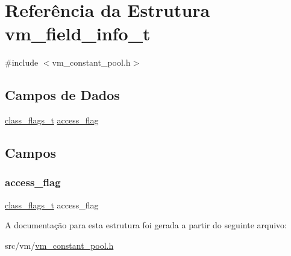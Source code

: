 \hypertarget{structvm__field__info__t}{}\section{Referência da Estrutura vm\+\_\+field\+\_\+info\+\_\+t}
\label{structvm__field__info__t}


{\ttfamily \#include $<$vm\+\_\+constant\+\_\+pool.\+h$>$}

\subsection*{Campos de Dados}
\begin{DoxyCompactItemize}
\item 
\hyperlink{vm__constant__pool_8h_a031d95f87ee8ea61a12297cc5e45b645}{class\+\_\+flags\+\_\+t} \hyperlink{structvm__field__info__t_a0ed46c37e2835f9d7d37ed57ce0cef23}{access\+\_\+flag}
\end{DoxyCompactItemize}


\subsection{Campos}
\mbox{\label{structvm__field__info__t_a0ed46c37e2835f9d7d37ed57ce0cef23}} 
\subsubsection{\texorpdfstring{access\+\_\+flag}{access\_flag}}
{\footnotesize\ttfamily \hyperlink{vm__constant__pool_8h_a031d95f87ee8ea61a12297cc5e45b645}{class\+\_\+flags\+\_\+t} access\+\_\+flag}



A documentação para esta estrutura foi gerada a partir do seguinte arquivo\+:\begin{DoxyCompactItemize}
\item 
src/vm/\hyperlink{vm__constant__pool_8h}{vm\+\_\+constant\+\_\+pool.\+h}\end{DoxyCompactItemize}
